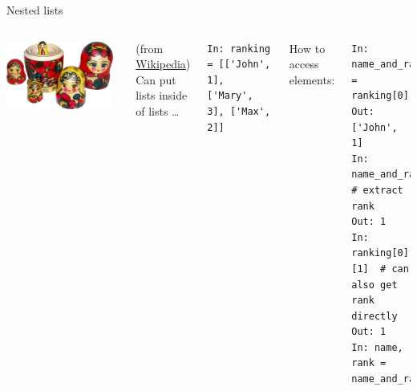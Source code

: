 \documentclass[aspectratio=169,usenames,dvipsnames]{beamer}
\begin{document}
\begin{frame}[fragile]{Nested lists}
    \begin{columns}
            \includegraphics[width=0.95\textwidth]{fig/russiandolls}

            {\scriptsize
            (from \href{https://en.wikipedia.org/wiki/Matryoshka_doll#/media/File:Matryoshka_transparent.png}{Wikipedia})}
            Can put lists inside of lists \dots
\begin{lstlisting}
In: ranking = [['John', 1], ['Mary', 3], ['Max', 2]]
\end{lstlisting}

\pause
How to access elements:
\begin{lstlisting}
In: name_and_rank = ranking[0]
Out: ['John', 1]
In: name_and_rank[1]  # extract rank
Out: 1
In: ranking[0][1]  # can also get rank directly
Out: 1
In: name, rank = name_and_rank
\end{lstlisting}
    \end{columns}
\end{frame}
\end{document}
